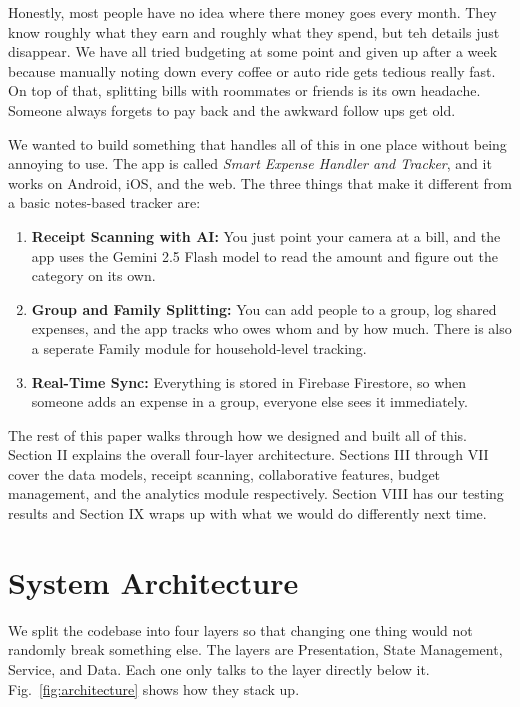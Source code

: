 \documentclass[conference]{IEEEtran}
\begin{document}
Honestly, most people have no idea where there money goes every month. They know roughly what they earn and roughly what they spend, but teh details just disappear. We have all tried budgeting at some point and given up after a week because manually noting down every coffee or auto ride gets tedious really fast. On top of that, splitting bills with roommates or friends is its own headache. Someone always forgets to pay back and the awkward follow ups get old.

We wanted to build something that handles all of this in one place without being annoying to use. The app is called \textit{Smart Expense Handler and Tracker}, and it works on Android, iOS, and the web. The three things that make it different from a basic notes-based tracker are:

\begin{enumerate}
  \item \textbf{Receipt Scanning with AI:} You just point your camera at a bill, and the app uses the Gemini 2.5 Flash model to read the amount and figure out the category on its own.
  \item \textbf{Group and Family Splitting:} You can add people to a group, log shared expenses, and the app tracks who owes whom and by how much. There is also a seperate Family module for household-level tracking.
  \item \textbf{Real-Time Sync:} Everything is stored in Firebase Firestore, so when someone adds an expense in a group, everyone else sees it immediately.
\end{enumerate}

The rest of this paper walks through how we designed and built all of this. Section II explains the overall four-layer architecture. Sections III through VII cover the data models, receipt scanning, collaborative features, budget management, and the analytics module respectively. Section VIII has our testing results and Section IX wraps up with what we would do differently next time.

\section{System Architecture}

We split the codebase into four layers so that changing one thing would not randomly break something else. The layers are Presentation, State Management, Service, and Data. Each one only talks to the layer directly below it. Fig.~\ref{fig:architecture} shows how they stack up.
\end{document}
